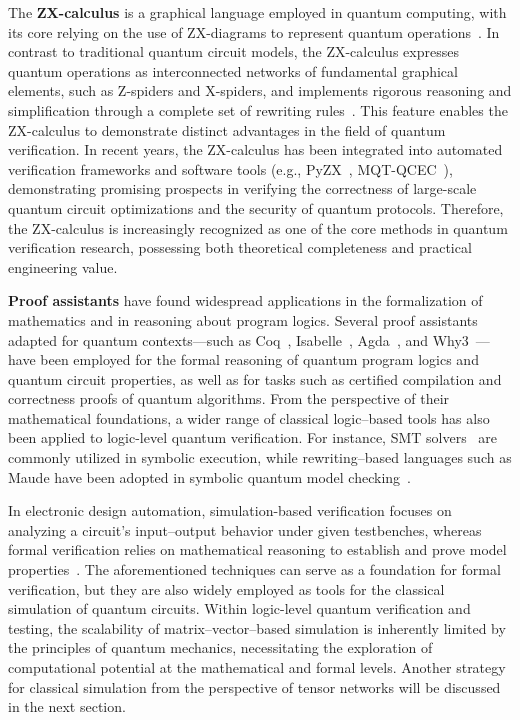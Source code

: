\documentclass[a4paper,onecolumn,11pt,unpublished]{quantumarticle}
\begin{document}
The \textbf{ZX-calculus} is a graphical language employed in quantum computing, with its core relying on the use of ZX-diagrams to represent quantum operations~\cite{Coecke_2011}. In contrast to traditional quantum circuit models, the ZX-calculus expresses quantum operations as interconnected networks of fundamental graphical elements, such as Z-spiders and X-spiders, and implements rigorous reasoning and simplification through a complete set of rewriting rules~\cite{Backens_2014}. This feature enables the ZX-calculus to demonstrate distinct advantages in the field of quantum verification. In recent years, the ZX-calculus has been integrated into automated verification frameworks and software tools (e.g., PyZX~\cite{kissinger2020Pyzx}, MQT-QCEC~\cite{burgholzerQCECJKQTool2021}), demonstrating promising prospects in verifying the correctness of large-scale quantum circuit optimizations and the security of quantum protocols. Therefore, the ZX-calculus is increasingly recognized as one of the core methods in quantum verification research, possessing both theoretical completeness and practical engineering value.

\textbf{Proof assistants} have found widespread applications in the formalization of mathematics and in reasoning about program logics. Several proof assistants adapted for quantum contexts---such as Coq~\cite{ZhouCoqq2023}, Isabelle~\cite{LiuQHLprover2019}, Agda~\cite{Bian_2023}, and Why3~\cite{CharetonQbricks2020}---have been employed for the formal reasoning of quantum program logics and quantum circuit properties, as well as for tasks such as certified compilation and correctness proofs of quantum algorithms. From the perspective of their mathematical foundations, a wider range of classical logic–based tools has also been applied to logic-level quantum verification. For instance, SMT solvers~\cite{CharetonQbricks2020, BauersymQV2023} are commonly utilized in symbolic execution, while rewriting–based languages such as Maude have been adopted in symbolic quantum model checking~\cite{do2024symbolic}.

\medskip

In electronic design automation, simulation-based verification focuses on analyzing a circuit's input–output behavior under given testbenches, whereas formal verification relies on mathematical reasoning to establish and prove model properties~\cite{wangEDAsvt2009}. The aforementioned techniques can serve as a foundation for formal verification, but they are also widely employed as tools for the classical simulation of quantum circuits. Within logic-level quantum verification and testing, the scalability of matrix–vector–based simulation is inherently limited by the principles of quantum mechanics, necessitating the exploration of computational potential at the mathematical and formal levels. Another strategy for classical simulation from the perspective of tensor networks will be discussed in the next section.
\end{document}

